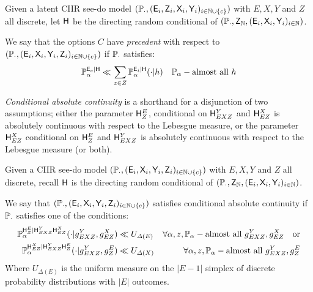 \begin{definition}[Precedent]\label{def:precedent}
Given a latent CIIR see-do model $(\mathbb{P}_\cdot,(\mathsf{E}_i,\mathsf{Z}_i,\mathsf{X}_i,\mathsf{Y}_i)_{i\in\mathbb{N}\cup\{c\}})$ with $E,X,Y$ and $Z$ all discrete, let $\mathsf{H}$ be the directing random conditional of $(\mathbb{P}_\cdot,\mathsf{Z}_{\mathbb{N}},(\mathsf{E}_i,\mathsf{X}_i,\mathsf{Y}_i)_{i\in \mathbb{N}})$. 

We say that the options $C$ have \emph{precedent} with respect to $(\mathbb{P}_\cdot,(\mathsf{E}_i,\mathsf{X}_i,\mathsf{Y}_i,\mathsf{Z}_i)_{i\in\mathbb{N}\cup\{c\}})$ if $\mathbb{P}_\cdot$ satisfies:
\begin{align}
    \mathbb{P}_\alpha^{\mathsf{E}_c|\mathsf{H}} &\ll \sum_{z\in Z}\mathbb{P}_\alpha^{\mathsf{E}_i|\mathsf{H}}(\cdot|h)&\mathbb{P}_\alpha-\text{almost all }h
\end{align}
\end{definition}

\emph{Conditional absolute continuity} is a shorthand for a disjunction of two assumptions; either the parameter $\mathsf{H}^E_Z$, conditional on $\mathsf{H}^Y_{EXZ}$ and $\mathsf{H}^X_{EZ}$ is absolutely continuous with respect to the Lebesgue measure, or the parameter $\mathsf{H}^{X}_{EZ}$ conditional on $\mathsf{H}^E_Z$ and $\mathsf{H}^Y_{EXZ}$ is absolutely continuous with respect to the Lebesgue measure (or both). 

\begin{definition}\label{def:absolute_continuity}
Given a CIIR see-do model $(\mathbb{P}_\cdot,(\mathsf{E}_i,\mathsf{X}_i,\mathsf{Y}_i,\mathsf{Z}_i)_{i\in\mathbb{N}\cup\{c\}})$ with $E,X,Y$ and $Z$ all discrete, recall $\mathsf{H}$ is the directing random conditional of $(\mathbb{P}_\cdot,\mathsf{Z}_{\mathbb{N}},(\mathsf{E}_i,\mathsf{X}_i,\mathsf{Y}_i)_{i\in \mathbb{N}})$. 

We say that $(\mathbb{P}_\cdot,(\mathsf{E}_i,\mathsf{X}_i,\mathsf{Y}_i,\mathsf{Z}_i)_{i\in\mathbb{N}\cup\{c\}})$ satisfies conditional absolute continuity if $\mathbb{P}_\cdot$ satisfies one of the conditions:
\begin{align}
    \mathbb{P}_{\alpha}^{\mathsf{H}^{E}_{Z}|\mathsf{H}^{Y}_{EXZ}\mathsf{H}^X_{EZ}}(\cdot|g^{Y}_{EXZ}, g^X_{EZ}) &\ll U_{\Delta(E)}& \forall \alpha, z, \mathbb{P}_\alpha-\text{almost all }g^{Y}_{EXZ}, g^X_{EZ} \quad \text{or}\\
    \mathbb{P}_{\alpha}^{\mathsf{H}^X_{EZ}|\mathsf{H}^{Y}_{EXZ}\mathsf{H}^{E}_{Z}}(\cdot|g^{Y}_{EXZ}, g^E_Z) &\ll U_{\Delta(X)}& \forall \alpha, z, \mathbb{P}_\alpha-\text{almost all }g^{Y}_{EXZ}, g^E_Z\label{eqApp:lebesgue_dom}
\end{align}
Where $U_{\Delta(E)}$ is the uniform measure on the $|E-1|$ simplex of discrete probability distributions with $|E|$ outcomes.
\end{definition}

